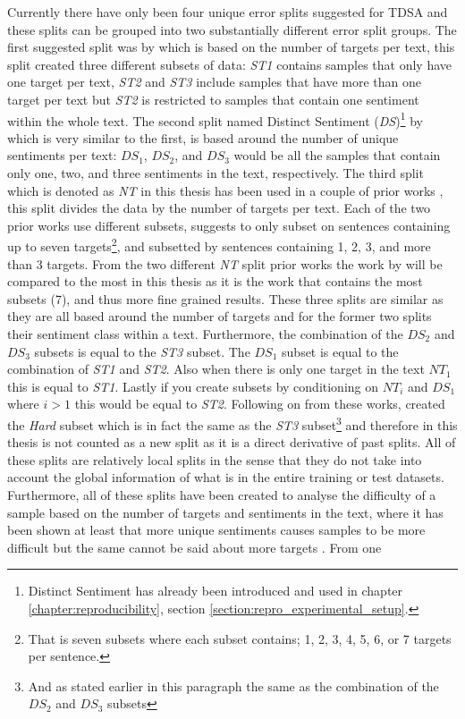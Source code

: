 Currently there have only been four unique error splits suggested for TDSA and these splits can be grouped into two substantially different error split groups. The first suggested split was by \citet{nguyen-shirai-2015-phrasernn} which is based on the number of targets per text, this split created three different subsets of data: \textit{ST1} contains samples that only have one target per text, \textit{ST2} and \textit{ST3} include samples that have more than one target per text but \textit{ST2} is restricted to samples that contain one sentiment within the whole text. The second split named Distinct Sentiment (\textit{DS})\footnote{Distinct Sentiment has already been introduced and used in chapter \ref{chapter:reproducibility}, section \ref{section:repro_experimental_setup}.} by \citet{wang-etal-2017-tdparse} which is very similar to the first, is based around the number of unique sentiments per text: $DS_1$, $DS_2$, and $DS_3$ would be all the samples that contain only one, two, and three sentiments in the text, respectively. The third split which is denoted as \textit{NT} in this thesis has been used in a couple of prior works \citep{he-etal-2018-effective, zhang-etal-2019-aspect}, this split divides the data by the number of targets per text. Each of the two prior works use different subsets, \citet{zhang-etal-2019-aspect} suggests to only subset on sentences containing up to seven targets\footnote{That is seven subsets where each subset contains; 1, 2, 3, 4, 5, 6, or 7 targets per sentence.}, and \citet{he-etal-2018-effective} subsetted by sentences containing 1, 2, 3, and more than 3 targets. From the two different \textit{NT} split prior works the work by \citet{zhang-etal-2019-aspect} will be compared to the most in this thesis as it is the work that contains the most subsets (7), and thus more fine grained results. These three splits are similar as they are all based around the number of targets and for the former two splits their sentiment class within a text. Furthermore, the combination of the $DS_2$ and $DS_3$ subsets is equal to the \textit{ST3} subset. The $DS_1$ subset is equal to the combination of \textit{ST1} and \textit{ST2}. Also when there is only one target in the text $NT_1$ this is equal to \textit{ST1}. Lastly if you create subsets by conditioning on $NT_i$ and $DS_1$ where $i>1$ this would be equal to \textit{ST2}. Following on from these works, \citet{xue-li-2018-aspect} created the \textit{Hard} subset which is in fact the same as the \textit{ST3} subset\footnote{And as stated earlier in this paragraph the same as the combination of the $DS_2$ and $DS_3$ subsets} and therefore in this thesis is not counted as a new split as it is a direct derivative of past splits. All of these splits are relatively local splits in the sense that they do not take into account the global information of what is in the entire training or test datasets. Furthermore, all of these splits have been created to analyse the difficulty of a sample based on the number of targets and sentiments in the text, where it has been shown at least that more unique sentiments causes samples to be more difficult \citep{wang-etal-2017-tdparse,nguyen-shirai-2015-phrasernn} but the same cannot be said about more targets \citep{zhang-etal-2019-aspect,nguyen-shirai-2015-phrasernn}. From one 